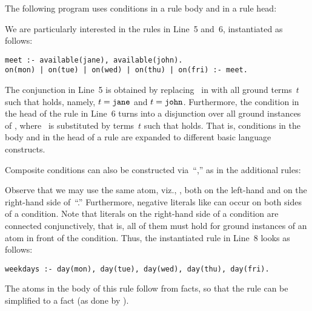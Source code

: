 \begin{example}\label{ex:cond}
The following program uses conditions in a rule body and in a rule head:
%

%
We are particularly interested in the rules in Line~5 and~6,
instantiated as follows:%
\begin{lstlisting}[numbers=none]
meet :- available(jane), available(john).
on(mon) | on(tue) | on(wed) | on(thu) | on(fri) :- meet.
\end{lstlisting}
%
The conjunction in Line~5 is obtained by replacing~ in
 with all ground terms~$t$ such that
 holds, namely, $t=\texttt{jane}$ and $t=\texttt{john}$.
Furthermore, the condition in the head of the rule in Line~6 turns into
a disjunction over all ground instances of
, where~ is substituted by terms~$t$
such that
 holds.
That is, conditions in the body and in the head of a rule
are expanded to different basic language constructs.

Composite conditions can also be constructed via~``\code{:},''
as in the additional rules:
%

%
Observe that we may use the same atom, viz., ,
both on the left-hand and on the right-hand side of~``\code{:}.''
Furthermore, negative literals like 
can occur on both sides of a condition.
Note that literals on the right-hand side of a condition are connected conjunctively, that is,
all of them must hold for ground instances of an atom in front
of the condition.
Thus, the instantiated rule in Line~8 looks as follows:
%
\begin{lstlisting}[firstnumber=8]
weekdays :- day(mon), day(tue), day(wed), day(thu), day(fri).
\end{lstlisting}
%
The atoms in the body of this rule follow from facts, so that
the rule can be simplified to a fact 
(as done by \gringo).
\eexample
\end{example}

